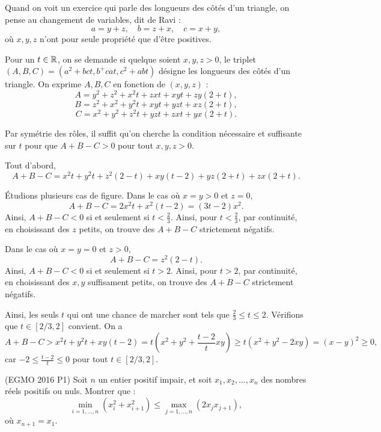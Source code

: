 \begin{sol}
Quand on voit un exercice qui parle des longueurs des côtés d'un triangle, on pense au changement de variables, dit de Ravi :
\[
a=y+z, \quad b=z+x, \quad c=x+y,
\]
où $x,y,z$ n'ont pour seule propriété que d'être positives.

Pour un $t \in \mathbb R$, on se demande si quelque soient $x,y,z > 0$, le triplet $(A,B,C)=(a^2+bct,b^+cat,c^2+abt)$ désigne les longueurs des côtés d'un triangle. On exprime $A,B,C$ en fonction de $(x,y,z)$ :
\[
A=y^2+z^2+x^2t+zxt+xyt+zy(2+t),
\]
\[
B=z^2+x^2+y^2t+xyt+yzt+xz(2+t),
\]
\[
C=x^2+y^2+z^2t+yzt+zxt+yx(2+t).
\]

Par symétrie des rôles, il suffit qu'on cherche la condition nécessaire et suffisante sur $t$ pour que $A+B-C>0$ pour tout $x,y,z>0$.

Tout d'abord,
\[
A+B-C=x^2t+y^2t+z^2(2-t)+xy(t-2)+yz(2+t)+zx(2+t).
\]

Étudions plusieurs cas de figure. Dans le cas où $x=y>0$ et $z=0$,
\[
A+B-C=2x^2t+x^2(t-2)=(3t-2)x^2.
\]
Ainsi, $A+B-C<0$ si et seulement si $t<\frac2{3}$. Ainsi, pour $t<\frac2{3}$, par continuité, en choisissant des $z$ petits, on trouve des $A+B-C$ strictement négatifs.

Dans le cas où $x=y=0$ et $z>0$,
\[
A+B-C=z^2(2-t).
\]
Ainsi, $A+B-C<0$ si et seulement si $t>2$. Ainsi, pour $t>2$, par continuité, en choisissant des $x,y$ suffisament petits, on trouve des $A+B-C$ strictement négatifs.

Ainsi, les seuls $t$ qui ont une chance de marcher sont tels que $\frac2{3} \leq t \leq 2$. Vérifions que $t\in[2/3,2]$ convient. On a
\[
A+B-C > x^2t+y^2t+xy(t-2) = t\left(x^2+y^2+\frac{t-2}{t}xy\right) \geq t(x^2+y^2-2xy) = (x-y)^2 \geq 0,
\]
car $-2 \leq \frac{t-2}{t} \leq 0$ pour tout $t\in[2/3,2]$.
\end{sol}






\begin{exo}
(EGMO 2016 P1)
Soit $n$ un entier positif impair, et soit $x_1,x_2,\dots,x_n$ des nombres réels positifs ou nuls. Montrer que :
\[
\min_{i=1,\dots,n}(x_i^2+x_{i+1}^2) \leq \max_{j=1,\dots,n}(2x_jx_{j+1}),
\]
où $x_{n+1}=x_1$.
\end{exo}


